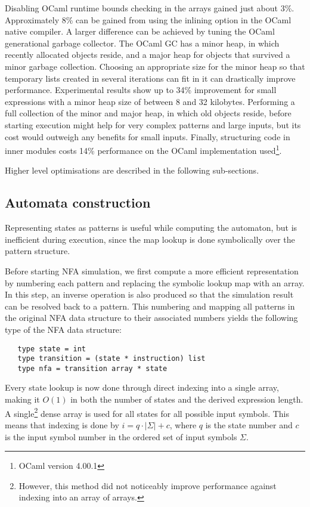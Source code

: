Disabling OCaml runtime bounds checking in the arrays gained just about 3\%.
Approximately 8\% can be gained from using the inlining option in the OCaml
native compiler. A larger difference can be achieved by tuning the OCaml
generational garbage collector. The OCaml GC has a minor heap, in which recently
allocated objects reside, and a major heap for objects that survived a minor
garbage collection. Choosing an appropriate size for the minor heap so that
temporary lists created in several iterations can fit in it can drastically
improve performance. Experimental results show up to 34\% improvement for small
expressions with a minor heap size of between 8 and 32 kilobytes. Performing a
full collection of the minor and major heap, in which old objects reside, before
starting execution might help for very complex patterns and large inputs, but
its cost would outweigh any benefits for small inputs. Finally, structuring code
in inner modules costs 14\% performance on the OCaml implementation
used\footnote{OCaml version 4.00.1}.

Higher level optimisations are described in the following sub-sections.


\subsection{Automata construction}

Representing states as patterns is useful while computing the automaton, but is
inefficient during execution, since the map lookup is done symbolically over the
pattern structure.

Before starting NFA simulation, we first compute a more efficient representation
by numbering each pattern and replacing the symbolic lookup map with an array.
In this step, an inverse operation is also produced so that the simulation
result can be resolved back to a pattern. This numbering and mapping all
patterns in the original NFA data structure to their associated numbers yields
the following type of the NFA data structure:

\begin{lstlisting}
   type state = int
   type transition = (state * instruction) list
   type nfa = transition array * state
\end{lstlisting}

Every state lookup is now done through direct indexing into a single array,
making it $O(1)$ in both the number of states and the derived expression length.
A single\footnote{However, this method did not noticeably improve performance
against indexing into an array of arrays.} dense array is used for all states
for all possible input symbols. This means that indexing is done by $i = q \cdot
|\Sigma| + c$, where $q$ is the state number and $c$ is the input symbol number
in the ordered set of input symbols $\Sigma$.


